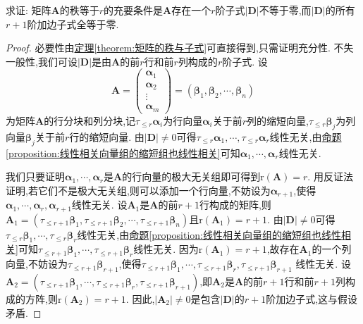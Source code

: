 \documentclass[../../main.tex]{subfiles}%
\begin{document}
\begin{proposition}\label{proposition:矩阵的秩与子式及其加边子式的关系}
求证: 矩阵\(\boldsymbol{A}\)的秩等于\(r\)的充要条件是\(\boldsymbol{A}\)存在一个\(r\)阶子式\(|\boldsymbol{D}|\)不等于零,而\(|\boldsymbol{D}|\)的所有\(r + 1\)阶加边子式全等于零.
\end{proposition}
\begin{proof}

必要性由\hyperref[theorem:矩阵的秩与子式]{定理\ref{theorem:矩阵的秩与子式}}可直接得到,只需证明充分性. 不失一般性,我们可设\(|\boldsymbol{D}|\)是由\(\boldsymbol{A}\)的前\(r\)行和前\(r\)列构成的\(r\)阶子式. 设
\[
\boldsymbol{A}=\begin{pmatrix}
\boldsymbol{\alpha}_1\\
\boldsymbol{\alpha}_2\\
\vdots\\
\boldsymbol{\alpha}_m
\end{pmatrix}=(\boldsymbol{\beta}_1,\boldsymbol{\beta}_2,\cdots,\boldsymbol{\beta}_n)
\]
为矩阵\(\boldsymbol{A}\)的行分块和列分块,记\(\tau_{\leqslant  r}\boldsymbol{\alpha}_i\)为行向量\(\boldsymbol{\alpha}_i\)关于前\(r\)列的缩短向量,\(\tau_{\leqslant  r}\boldsymbol{\beta}_j\)为列向量\(\boldsymbol{\beta}_j\)关于前\(r\)行的缩短向量. 由\(|\boldsymbol{D}|\neq0\)可得\(\tau_{\leqslant  r}\boldsymbol{\alpha}_1,\cdots,\tau_{\leqslant  r}\boldsymbol{\alpha}_r\)线性无关,由\hyperref[proposition:线性相关向量组的缩短组也线性相关]{命题\ref{proposition:线性相关向量组的缩短组也线性相关}}可知\(\boldsymbol{\alpha}_1,\cdots,\boldsymbol{\alpha}_r\)线性无关. 

我们只要证明\(\boldsymbol{\alpha}_1,\cdots,\boldsymbol{\alpha}_r\)是\(\boldsymbol{A}\)的行向量的极大无关组即可得到\(\mathrm{r}(\boldsymbol{A}) = r\). 用反证法证明,若它们不是极大无关组,则可以添加一个行向量,不妨设为\(\boldsymbol{\alpha}_{r + 1}\),使得\(\boldsymbol{\alpha}_1,\cdots,\boldsymbol{\alpha}_r,\boldsymbol{\alpha}_{r + 1}\)线性无关. 设\(\boldsymbol{A}_1\)是\(\boldsymbol{A}\)的前\(r + 1\)行构成的矩阵,则\(\boldsymbol{A}_1 = (\tau_{\leqslant  r + 1}\boldsymbol{\beta}_1,\tau_{\leqslant  r + 1}\boldsymbol{\beta}_2,\cdots,\tau_{\leqslant  r + 1}\boldsymbol{\beta}_n)\)且\(\mathrm{r}(\boldsymbol{A}_1)=r + 1\). 由\(|\boldsymbol{D}|\neq0\)可得\(\tau_{\leqslant  r}\boldsymbol{\beta}_1,\cdots,\tau_{\leqslant  r}\boldsymbol{\beta}_r\)线性无关,由\hyperref[proposition:线性相关向量组的缩短组也线性相关]{命题\ref{proposition:线性相关向量组的缩短组也线性相关}}可知\(\tau_{\leqslant  r + 1}\boldsymbol{\beta}_1,\cdots,\tau_{\leqslant  r + 1}\boldsymbol{\beta}_r\)线性无关. 因为\(\mathrm{r}(\boldsymbol{A}_1)=r + 1\),故存在\(\boldsymbol{A}_1\)的一个列向量,不妨设为\(\tau_{\leqslant  r + 1}\boldsymbol{\beta}_{r + 1}\),使得\(\tau_{\leqslant  r + 1}\boldsymbol{\beta}_1,\cdots,\tau_{\leqslant  r + 1}\boldsymbol{\beta}_r,\tau_{\leqslant  r + 1}\boldsymbol{\beta}_{r + 1}\)
线性无关. 设\(\boldsymbol{A}_2 = (\tau_{\leqslant  r + 1}\boldsymbol{\beta}_1,\cdots,\tau_{\leqslant  r + 1}\boldsymbol{\beta}_r,\tau_{\leqslant  r + 1}\boldsymbol{\beta}_{r + 1})\),即\(\boldsymbol{A}_2\)是\(\boldsymbol{A}\)的前\(r + 1\)行和前\(r + 1\)列构成的方阵,则\(\mathrm{r}(\boldsymbol{A}_2)=r + 1\). 因此,\(|\boldsymbol{A}_2|\neq0\)是包含\(|\boldsymbol{D}|\)的\(r + 1\)阶加边子式,这与假设矛盾.


\end{proof}
\end{document}

